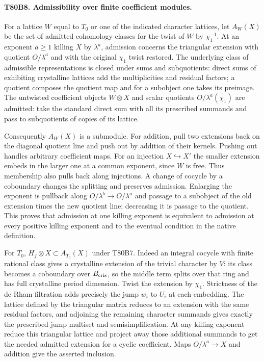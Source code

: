 \paragraph{T80B8. Admissibility over finite coefficient modules.}
For a lattice $W$ equal to $T_0$ or one of the indicated character
lattices, let $A_W(X)$ be the set of admitted cohomology classes for
the twist of $W$ by $\chi_1^{-1}$. At an exponent $a\ge1$ killing
$X$ by $\lambda^a$, admission concerns the triangular extension with
quotient $O/\lambda^a$ and with the original $\chi_1$ twist restored.
The underlying class of admissible representations is closed under sums
and subquotients: direct sums of exhibiting crystalline lattices add the
multiplicities and residual factors; a quotient composes the quotient
map and for a subobject one takes its preimage. The untwisted coefficient
objects $W\otimes X$ and scalar quotients $O/\lambda^a(\chi_1)$
are admitted: take the standard direct sum with all its prescribed
summands and pass to subquotients of copies of its lattice.

Consequently $A_W(X)$ is a submodule. For addition, pull two extensions
back on the diagonal quotient line and push out by addition of their
kernels. Pushing out handles arbitrary coefficient maps. For an injection
$X\hookrightarrow X'$ the smaller extension embeds in the larger one
at a common exponent, since $W$ is free. Thus membership also pulls back
along injections. A change of cocycle by a coboundary changes the
splitting and preserves admission. Enlarging the exponent is pullback
along $O/\lambda^b\to O/\lambda^a$ and passage to a subobject of
the old extension times the new quotient line; decreasing it is passage
to the quotient. This proves that admission at one killing exponent is
equivalent to admission at every positive killing exponent and to the
eventual condition in the native definition.

For $T_0$, $H_f\otimes X\subset A_{T_0}(X)$ under T80B7.
Indeed an integral cocycle with finite rational class gives a crystalline
extension of the trivial character by $V$: its class becomes a
coboundary over $B_{\rm cris}$, so the middle term splits over that
ring and has full crystalline period dimension. Twist the extension by
$\chi_1$. Strictness of the de Rham filtration adds precisely the jump
$w_i$ to $U_i$ at each embedding. The lattice defined by the triangular
matrix reduces to an extension with the same residual factors, and
adjoining the remaining character summands gives exactly the prescribed
jump multiset and semisimplification. At any killing exponent reduce
this triangular lattice and project away those additional summands to
get the needed admitted extension for a cyclic coefficient. Maps
$O/\lambda^a\to X$ and addition give the asserted inclusion.

